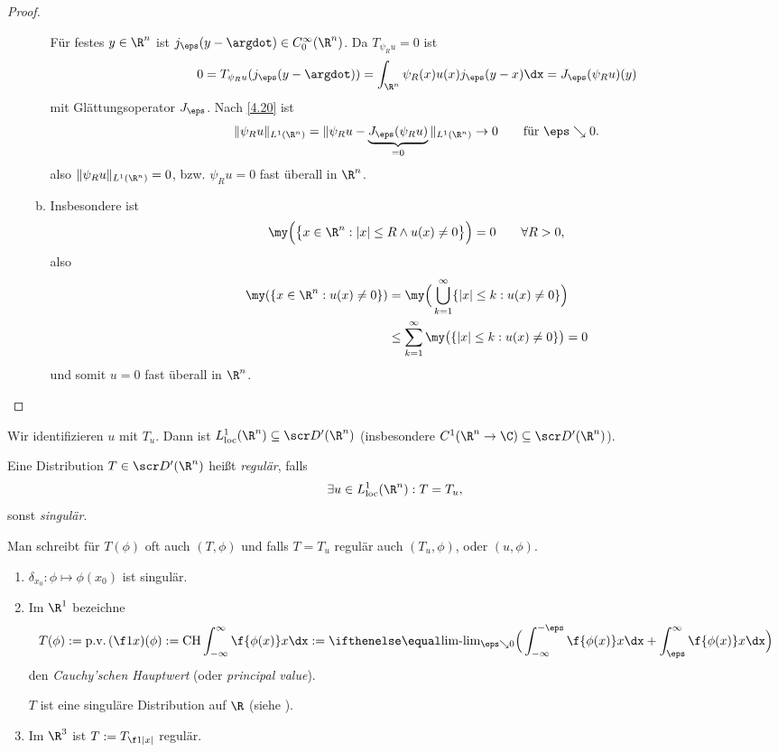 \begin{st}
\begin{proof}
\begin{enumerate}[1)]
\begin{enumerate}[a)]
						Für festes $y\in \R^n$ ist $j_\eps(y-\argdot) \in C_0^\infty(\R^n)$.
						Da $T_{\psi_R u} = 0$ ist
						\[
							0 = T_{\psi_R u} (j_\eps(y-\argdot))
							= \int_{\R^n} \psi_R(x) u(x) j_\eps(y-x) \dx
							= J_\eps(\psi_R u)(y)
						\]
						mit Glättungsoperator $J_\eps$.
						Nach \ref{4.20} ist
						\[
							\|\psi_R u \|_{L^1(\R^n)}
							= \|\psi_R u - \underbrace{J_\eps(\psi_R u)}_{=0} \|_{L^1(\R^n)}
							\to 0 \qquad \text{für $\eps \searrow 0$.}
						\]
						also $\|\psi_R u \|_{L^1(\R^n)} = 0$, bzw. $\psi_R u = 0$ fast überall in $\R^n$.
					\item
						Insbesondere ist
						\[
							\my \Big(\big\{ x \in \R^n : |x| \le R \land u(x) \neq 0 \big\} \Big) = 0
							\qquad \forall R > 0,
						\]
						also
						\begin{align*}
							\my(\{x\in \R^n : u(x) \neq 0\})
							&= \my \Big( \bigcup_{k=1}^\infty \{|x| \le k : u(x) \neq 0\} \Big) \\
							&\le \sum_{k=1}^\infty \my \big( \{|x|\le k : u(x)\neq 0\}\big)
							= 0
						\end{align*}
						und somit $u= 0$ fast überall in $\R^n$.
				\end{enumerate}
		\end{enumerate}
	\end{proof}
\end{st}

\begin{df} \label{5.8}
	Wir identifizieren $u$ mit $T_u$.
	Dann ist $L_{\text{loc}}^1 (\R^n) \subset \scr D'(\R^n)$ (insbesondere $C^1(\R^n \to \C) \subset \scr D'(\R^n)$).

	Eine Distribution $T \in \scr D'(\R^n)$ heißt \emph{regulär}, falls
	\[
		\exists u \in L_{\text{loc}}^1 (\R^n) : T = T_u,
	\]
	sonst \emph{singulär}.

	Man schreibt für $T(\phi)$ oft auch $(T,\phi)$ und falls $T = T_u$ regulär auch $(T_u, \phi)$, oder $(u, \phi)$.
\end{df}

\begin{ex} \label{5.9}
	\begin{enumerate}[1)]
		\item
			$\delta_{x_0} : \phi \mapsto \phi(x_0)$ ist singulär.
		\item
			Im $\R^1$ bezeichne
			\[
				T(\phi)
				:= \pv (\f 1x)(\phi)
				:= \CH \int_{-\infty}^\infty \f {\phi(x)}x \dx
				:= \lim_{\eps \searrow 0} \Big( \int_{-\infty}^{-\eps} \f{\phi(x)}x \dx + \int_{\eps}^\infty \f {\phi(x)}x \dx \Big)
			\]
			den \emph{Cauchy'schen Hauptwert} (oder \emph{principal value}).

			$T$ ist eine singuläre Distribution auf $\R$ (siehe ).
		\item
			Im $\R^3$ ist $T := T_{\f 1{|x|}}$ regulär.
	\end{enumerate}
\end{ex}

